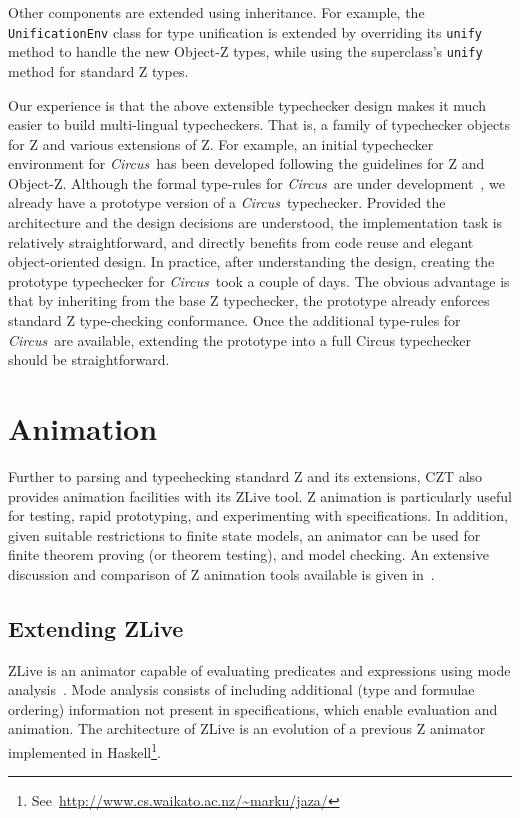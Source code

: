 \documentclass{llncs}
\newcommand{\Circus}{{\sf\slshape Circus}}
\begin{document}
Other components are extended using inheritance.  For example, the
\texttt{UnificationEnv} class for type unification is extended by
overriding its {\tt unify} method to handle the new Object-Z types,
while using the superclass's {\tt unify} method for standard Z types.

Our experience is that the above extensible typechecker design makes
it much easier to build multi-lingual typecheckers.  That is, a family
of typechecker objects for Z and various extensions of Z.
%
For example, an initial typechecker environment for \Circus\ has been
developed following the guidelines for Z and Object-Z. Although the
formal type-rules for \Circus\ are under
development~\cite{circus.other:typechecker}, we already have a
prototype version of a \Circus\ typechecker.  Provided the
architecture and the design decisions are understood, the
implementation task is relatively straightforward, and directly
benefits from code reuse and elegant object-oriented design.  In
practice, after understanding the design, creating the prototype
typechecker for \Circus\ took a couple of days. The obvious advantage
is that by inheriting from the base Z typechecker, the prototype already
enforces standard Z type-checking conformance. Once the additional
type-rules for \Circus\ are available, extending the prototype into a full
Circus typechecker should be straightforward.


\section{Animation}\label{animation}

    Further to parsing and typechecking standard Z and its extensions,
    CZT also provides animation facilities with its ZLive tool.  Z
    animation is particularly useful for testing, rapid prototyping,
    and experimenting with specifications.  In addition, given
    suitable restrictions to finite state models, an animator can be
    used for finite theorem proving (or theorem testing), and model
    checking.  An extensive discussion and comparison of Z animation
    tools available is given in~\cite{utting-jaza}.

\subsection{Extending ZLive}

    ZLive is an animator capable of evaluating predicates and
    expressions using mode analysis~\cite{winikooff98}.
    Mode analysis consists of including additional (type and formulae
    ordering) information not present in specifications, which enable
    evaluation and animation.
    The architecture of ZLive is an evolution of a previous Z animator
    implemented in 
    Haskell\footnote{See~\url{http://www.cs.waikato.ac.nz/~marku/jaza/}}.
\end{document}
